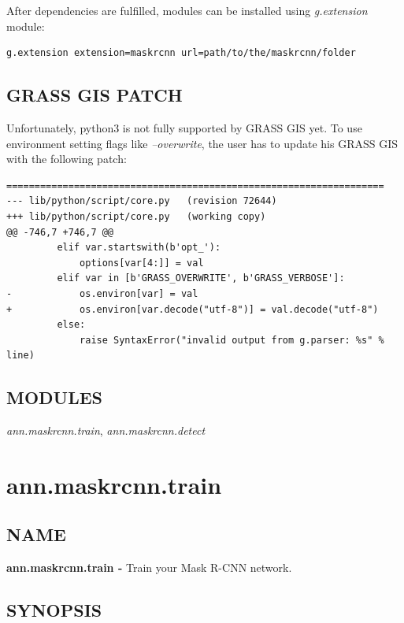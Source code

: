 After dependencies are fulfilled, modules can be installed using
\emph{g.extension} module:
{\footnotesize
\begin{lstlisting}
g.extension extension=maskrcnn url=path/to/the/maskrcnn/folder
\end{lstlisting}
}


\subsection*{GRASS GIS PATCH}

Unfortunately, python3 is not fully supported by GRASS GIS yet. To use
environment setting flags like \emph{--overwrite}, the user has to update
his GRASS GIS with the following patch:

{\footnotesize
\begin{lstlisting}[breaklines=true]
===================================================================
--- lib/python/script/core.py	(revision 72644)
+++ lib/python/script/core.py	(working copy)
@@ -746,7 +746,7 @@
         elif var.startswith(b'opt_'):
             options[var[4:]] = val
         elif var in [b'GRASS_OVERWRITE', b'GRASS_VERBOSE']:
-            os.environ[var] = val
+            os.environ[var.decode("utf-8")] = val.decode("utf-8")
         else:
             raise SyntaxError("invalid output from g.parser: %s" % line)
\end{lstlisting}
}

\subsection*{MODULES}

\emph{ann.maskrcnn.train},\emph{ }\emph{ann.maskrcnn.detect}\emph{ }

\clearpage

\section{ann.maskrcnn.train}

\subsection*{NAME}

\textbf{ann.maskrcnn.train -} Train your Mask R-CNN network.

\subsection*{SYNOPSIS}

